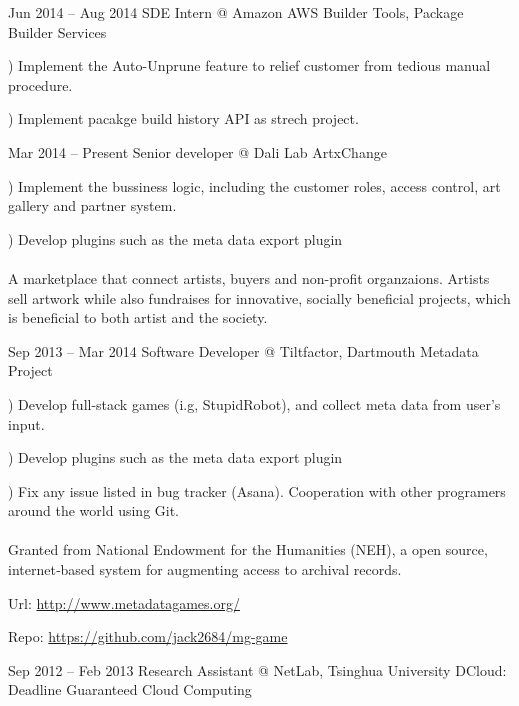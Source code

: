 \documentclass{tccv}
\begin{document}
\begin{eventlist}

\item{Jun 2014 -- Aug 2014}
     {SDE Intern @ Amazon AWS}
     {Builder Tools, Package Builder Services}
     
     ) Implement the Auto-Unprune feature to relief customer from tedious manual procedure. 
     
     ) Implement pacakge build history API as strech project.

\item{Mar 2014 -- Present}
     {Senior developer @ Dali Lab}
     {ArtxChange}
     
     ) Implement the bussiness logic, including the customer roles, access control, art gallery and partner system.
     
     ) Develop plugins such as the meta data export plugin
     \\\\
     A marketplace that connect artists, buyers and non-profit organzaions. Artists sell artwork while also fundraises for innovative, socially beneficial projects, which is beneficial to both artist and the society.

\item{Sep 2013 -- Mar 2014}
     {Software Developer @ Tiltfactor, Dartmouth}
     {Metadata Project}
     
     ) Develop full-stack games (i.g, StupidRobot), and collect meta data from user's input.
     
     ) Develop plugins such as the meta data export plugin
     
     ) Fix any issue listed in bug tracker (Asana). Cooperation with other programers around the world using Git.
     \\\\
     Granted from National Endowment for the Humanities (NEH), a open source, internet‐based system for augmenting access to archival records.
	
      Url: \underline{http://www.metadatagames.org/}

      Repo:  \underline{https://github.com/jack2684/mg-game}

     
     
\item{Sep 2012 -- Feb 2013}
     {Research Assistant @ NetLab, Tsinghua University}
     {DCloud: Deadline Guaranteed Cloud Computing}
     

\end{eventlist}
\end{document}

